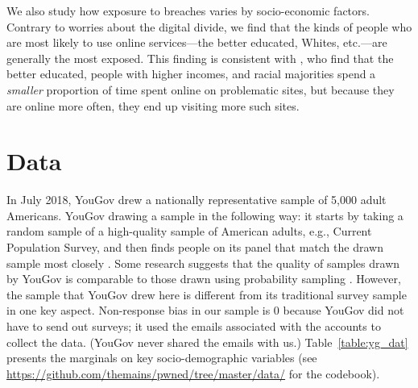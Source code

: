 \documentclass[12pt, letterpaper]{article}
\begin{document}
We also study how exposure to breaches varies by socio-economic factors. Contrary to worries about the digital divide, we find that the kinds of people who are most likely to use online services---the better educated, Whites, etc.---are generally the most exposed. This finding is consistent with \citet{laohaprapanon2018domain}, who find that the better educated, people with higher incomes, and racial majorities spend a \textit{smaller} proportion of time spent online on problematic sites, but because they are online more often, they end up visiting more such sites.

\section*{Data}
In July 2018, YouGov drew a nationally representative sample of 5,000 adult Americans. YouGov drawing a sample in the following way:  it starts by taking a random sample of a high-quality sample of American adults, e.g., Current Population Survey, and then finds people on its panel that match the drawn sample most closely \citep[for more details, see][]{rivers}. Some research suggests that the quality of samples drawn by YouGov is comparable to those drawn using probability sampling \citep{ansolabehere2014does}. However, the sample that YouGov drew here is different from its traditional survey sample in one key aspect. Non-response bias in our sample is 0 because YouGov did not have to send out surveys; it used the emails associated with the accounts to collect the data. (YouGov never shared the emails with us.) Table~\ref{table:yg_dat} presents the marginals on key socio-demographic variables (see \href{https://github.com/themains/pwned/tree/master/data/}{https://github.com/themains/pwned/tree/master/data/} for the codebook). 
\end{document}

